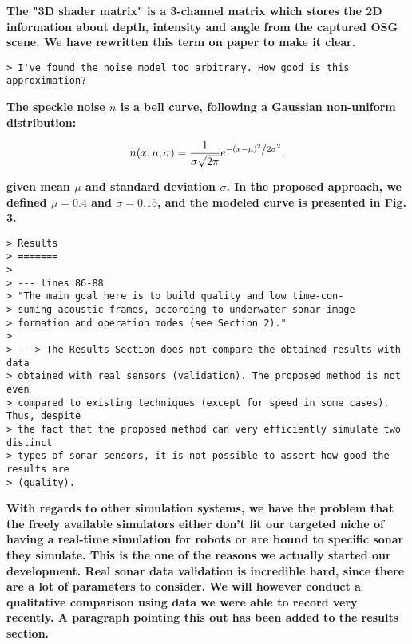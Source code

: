\documentclass{article}
\begin{document}
\textbf{The "3D shader matrix" is a 3-channel matrix which stores the 2D information
about depth, intensity and angle from the captured OSG scene. We have rewritten this
term on paper to make it clear.}

\begin{verbatim}
> I've found the noise model too arbitrary. How good is this approximation?
\end{verbatim}

\textbf{The speckle noise $n$ is a bell curve, following a Gaussian non-uniform
distribution:}

\begin{equation*}
n(x;\mu,\sigma) = \frac{1}{{\sigma \sqrt {2\pi } }}e^{{{ - \left( {x - \mu } \right)^2 } \mathord{\left/ {\vphantom {{ - \left( {x - \mu } \right)^2 } {2\sigma ^2 }}} \right. \kern-\nulldelimiterspace} {2\sigma ^2 }}},
\end{equation*}

\textbf{given mean $\mu$ and standard deviation $\sigma$. In the proposed approach,
we defined $\mu = 0.4$ and $\sigma = 0.15$, and the modeled curve is presented in Fig. 3.}

\begin{verbatim}
> Results
> =======
>
> --- lines 86-88
> "The main goal here is to build quality and low time-con-
> suming acoustic frames, according to underwater sonar image
> formation and operation modes (see Section 2)."
>
> ---> The Results Section does not compare the obtained results with data
> obtained with real sensors (validation). The proposed method is not even
> compared to existing techniques (except for speed in some cases). Thus, despite
> the fact that the proposed method can very efficiently simulate two distinct
> types of sonar sensors, it is not possible to assert how good the results are
> (quality).
\end{verbatim}

\textbf{With regards to other simulation systems, we have the problem that the freely available 
simulators either don't fit our targeted niche of having a real-time simulation for robots or are
bound to specific sonar they simulate. This is the one of the reasons we actually started our 
development.
Real sonar data validation is incredible hard, since there are a lot of parameters to consider. We 
will however conduct a qualitative comparison using data we were able to record very recently.
A paragraph pointing this out has been added to the results section.}
\end{document}
